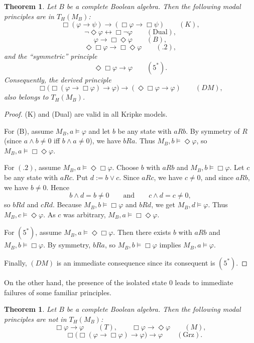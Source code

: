 \documentclass[10pt,a4paper]{amsart}
\newtheorem{theorem}[definition]{Theorem}
\begin{document}
\begin{theorem}\label{thm:general-valid}
Let $B$ be a complete Boolean algebra. Then the following modal principles are in $T_H(M_B)$:
\[
\Box(\varphi\to\psi)\to (\Box\varphi\to \Box\psi)\qquad (K),
\]
\[
\neg\Diamond\varphi \leftrightarrow \Box\neg\varphi \qquad (\mathrm{Dual}),
\]
\[
\varphi \to \Box\Diamond\varphi \qquad (B),
\]
\[
\Diamond\Box\varphi \to \Box\Diamond\varphi\qquad (.2),
\]
and the ``symmetric'' principle
\[
\Diamond\Box\varphi \to \varphi \qquad (5^\ast).
\]
Consequently, the derived principle
\[
\Box\bigl(\Box(\varphi\to\Box\varphi)\to\varphi\bigr)\to(\Diamond\Box\varphi\to\varphi)\qquad (DM),
\]
also belongs to $T_H(M_B)$.
\end{theorem}

\begin{proof}
(K) and (Dual) are valid in all Kripke models.

For (B), assume $M_B,a\models \varphi$ and let $b$ be any state with $aRb$.
By symmetry of $R$ (since $a\wedge b\neq 0$ iff $b\wedge a\neq 0$), we have $bRa$.
Thus $M_B,b\models \Diamond\varphi$, so $M_B,a\models \Box\Diamond\varphi$.

For $(.2)$, assume $M_B,a\models \Diamond\Box\varphi$.
Choose $b$ with $aRb$ and $M_B,b\models \Box\varphi$.
Let $c$ be any state with $aRc$.
Put $d:=b\vee c$.
Since $aRc$, we have $c\neq 0$, and since $aRb$, we have $b\neq 0$.
Hence
\[
b\wedge d=b\neq 0
\qquad\text{and}\qquad
c\wedge d=c\neq 0,
\]
so $bRd$ and $cRd$.
Because $M_B,b\models \Box\varphi$ and $bRd$, we get $M_B,d\models \varphi$.
Thus $M_B,c\models \Diamond\varphi$.
As $c$ was arbitrary, $M_B,a\models \Box\Diamond\varphi$.



For $(5^\ast)$, assume $M_B,a\models \Diamond\Box\varphi$.
Then there exists $b$ with $aRb$ and $M_B,b\models \Box\varphi$.
By symmetry, $bRa$, so $M_B,b\models \Box\varphi$ implies $M_B,a\models \varphi$.



Finally, $(DM)$ is an immediate consequence since its consequent is $(5^\ast)$.
\end{proof}


On the other hand, the presence of the isolated state $0$ leads to immediate failures of some familiar principles.

\begin{theorem}\label{thm:general-fail}
Let $B$ be a complete Boolean algebra. Then the following modal principles are not in $T_H(M_B)$:
\[
\Box\varphi \to \varphi \qquad (T),
\qquad
\Box\varphi\to\Diamond\varphi \qquad (M),
\]
\[
\quad
\Box\bigl(\Box(\varphi\to \Box\varphi)\to \varphi\bigr)\to \varphi \qquad (\mathrm{Grz}).
\]
\end{theorem}
\end{document}
